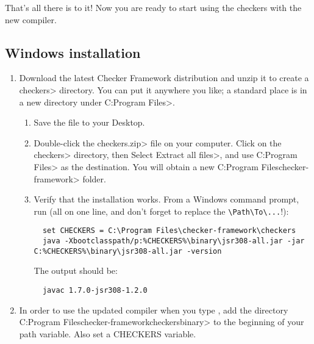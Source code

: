 That's all there is to it!  Now you are ready to start using the checkers with
the new  compiler.

\subsection{Windows installation\label{windows-installation}}

\begin{enumerate}

\item
  Download the latest Checker Framework distribution
  and unzip it to create a \<checkers> directory.  You can put it anywhere
  you like; a standard place is in a new directory under \<C:\ttbs{}Program
  Files>.

\begin{enumerate}
\item
  Save the file
  to your Desktop.
\item
  Double-click the \<checkers.zip> file on your computer.  Click on
  the \<checkers> directory, then Select \<Extract all files>, and use
  \<C:\ttbs{}Program Files> as the destination.  You will obtain a new
  \<C:\ttbs{}Program Files\ttbs{}checker-framework> folder.
\item
  Verify that the installation works.  From a Windows command prompt, run
  (all on one line, and don't forget to replace the \verb|\Path\To\...|!):

\begin{Verbatim}
  set CHECKERS = C:\Program Files\checker-framework\checkers
  java -Xbootclasspath/p:%CHECKERS%\binary\jsr308-all.jar -jar C:%CHECKERS%\binary\jsr308-all.jar -version
\end{Verbatim}

The output should be:

\begin{Verbatim}
  javac 1.7.0-jsr308-1.2.0
\end{Verbatim}

\end{enumerate}


\item
  In order to use the updated compiler when you type , add the
  directory \<C:\ttbs{}Program Files\ttbs{}checker-framework\ttbs{}checkers\ttbs{}binary> to the
  beginning of your path variable.  Also set a CHECKERS variable.


\end{enumerate}
